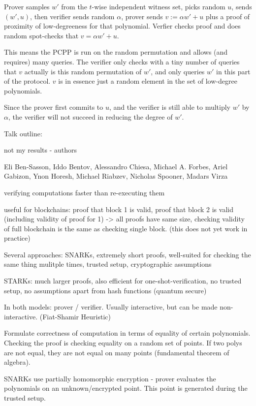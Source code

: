 \documentclass[11pt,letterpaper]{article}
\begin{document}
Prover samples $w'$ from the $t$-wise independent witness set,
picks random $u$, sends $(w', u)$, then verifier sends random $\alpha$,
prover sends $v := \alpha w' + u$ plus a proof of proximity of low-degreeness for that polynomial.
Verfier checks proof and does random spot-checks that $v  = \alpha w' + u$.

This means the PCPP is run on the random permutation and allows (and requires) many queries.
The verifier only checks with a tiny number
of queries that $v$ actually is this random permutation of $w'$, and only queries
$w'$ in this part of the protocol.
$v$ is in essence just a random element in the set of low-degree polynomials.

Since the prover first commits to $u$, and the verifier is still able to multiply
$w'$ by $\alpha$, the verifier will not succeed in reducing
the degree of $w'$.


Talk outline:

not my results - authors

Eli Ben-Sasson, Iddo Bentov, Alessandro Chiesa, Michael A. Forbes, Ariel Gabizon, Ynon Horesh, Michael Riabzev,
Nicholas Spooner, Madars Virza



verifying computations faster than re-executing them

useful for blockchains: proof that block 1 is valid, proof that block 2 is valid (including validity of proof for 1)
-> all proofs have same size, checking validity of full blockchain is the same as checking single block.
(this does not yet work in practice)

Several approaches: SNARKs, extremely short proofs, well-suited for checking the same thing mulitple times, trusted setup,
cryptographic assumptions

STARKs: much larger proofs, also efficient for one-shot-verification, no trusted setup, no assumptions apart from hash
functions (quantum secure)

In both models: prover / verifier. Usually interactive, but can be made non-interactive. (Fiat-Shamir Heuristic)

Formulate correctness of computation in terms of equality of certain polynomials.
Checking the proof is checking equality on a random set of points. If two polys are not equal, they
are not equal on many points (fundamental theorem of algebra).

SNARKs use partially homomorphic encryption - prover evaluates the polynomials on an unknown/encrypted point.
This point is generated during the trusted setup.
\end{document}
